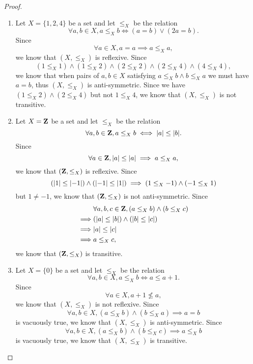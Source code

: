 \begin{proof}
    \begin{enumerate}
        \item Let \(X = \{1, 2, 4\}\) be a set and let \(\leq_X\) be the relation
              \[
                  \forall a, b \in X, a \leq_X b \iff (a = b) \lor (2a = b).
              \]
              Since
              \[
                  \forall a \in X, a = a \implies a \leq_X a,
              \]
              we know that \((X, \leq_X)\) is reflexive.
              Since
              \[
                  (1 \leq_X 1) \land (1 \leq_X 2) \land (2 \leq_X 2) \land (2 \leq_X 4) \land (4 \leq_X 4),
              \]
              we know that when pairs of \(a, b \in X\) satisfying \(a \leq_X b \land b \leq_X a\) we must have \(a = b\), thus \((X, \leq_X)\) is anti-symmetric.
              Since we have \((1 \leq_X 2) \land (2 \leq_X 4)\) but not \(1 \leq_X 4\), we know that \((X, \leq_X)\) is not transitive.
        \item Let \(X = \mathbf{Z}\) be a set and let \(\leq_X\) be the relation
              \[
                  \forall a, b \in \Z, a \leq_X b \iff \abs{a} \leq \abs{b}.
              \]
              Since
              \[
                  \forall a \in \mathbf{Z}, \left\lvert a\right\rvert \leq \left\lvert a\right\rvert \implies a \leq_X a,
              \]
              we know that \((\mathbf{Z}, \leq_X)\) is reflexive.
              Since
              \[
                  (\left\lvert1\right\rvert \leq \left\lvert-1\right\rvert) \land (\left\lvert-1\right\rvert \leq \left\lvert1\right\rvert) \implies (1 \leq_X -1) \land (-1 \leq_X 1)
              \]
              but \(1 \neq -1\), we know that \((\mathbf{Z}, \leq_X)\) is not anti-symmetric.
              Since
              \begin{align*}
                           & \forall a, b, c \in \Z, (a \leq_X b) \land (b \leq_X c) \\
                  \implies & (\abs{a} \leq \abs{b}) \land (\abs{b} \leq \abs{c})     \\
                  \implies & \abs{a} \leq \abs{c}                                    \\
                  \implies & a \leq_X c,
              \end{align*}
              we know that \((\mathbf{Z}, \leq_X)\) is transitive.
        \item Let \(X = \{0\}\) be a set and let \(\leq_X\) be the relation
              \[
                  \forall a, b \in X, a \leq_X b \iff a \leq a + 1.
              \]
              Since
              \[
                  \forall a \in X, a + 1 \not\leq a,
              \]
              we know that \((X, \leq_X)\) is not reflexive.
              Since
              \[
                  \forall a, b \in X, (a \leq_X b) \land (b \leq_X a) \implies a = b
              \]
              is vacuously true, we know that \((X, \leq_X)\) is anti-symmetric.
              Since
              \[
                  \forall a, b \in X, (a \leq_X b) \land (b \leq_X c) \implies a \leq_X b
              \]
              is vacuously true, we know that \((X, \leq_X)\) is transitive.
    \end{enumerate}
\end{proof}

